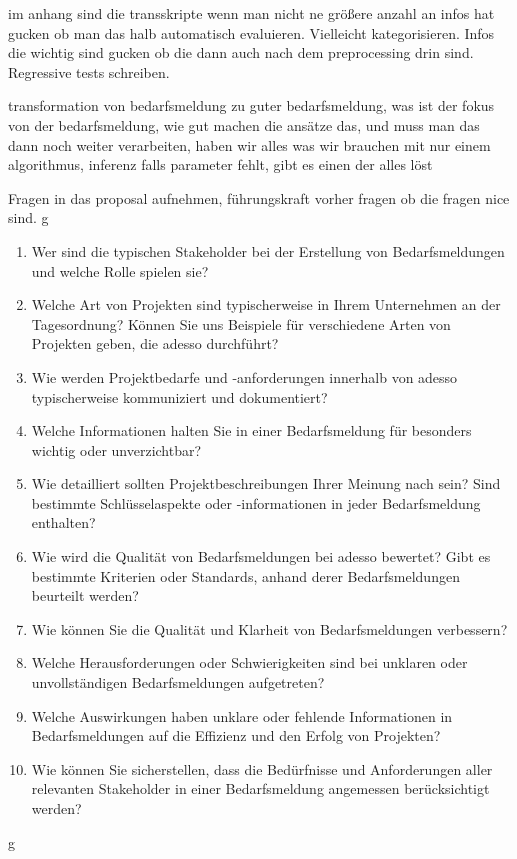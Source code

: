 im anhang sind die transskripte
wenn man nicht ne größere anzahl an infos hat gucken ob man das halb automatisch evaluieren. Vielleicht kategorisieren. Infos die wichtig sind gucken ob die dann auch nach dem preprocessing drin sind. Regressive tests schreiben.

transformation von bedarfsmeldung zu guter bedarfsmeldung, was ist der fokus von der bedarfsmeldung, wie gut machen die ansätze das, und muss man das dann noch weiter verarbeiten, haben wir alles was wir brauchen mit nur einem algorithmus, inferenz falls parameter fehlt, gibt es einen der alles löst

Fragen in das proposal aufnehmen, führungskraft vorher fragen ob die fragen nice sind.
\newpage
g
\begin{enumerate}
	\item Wer sind die typischen Stakeholder bei der Erstellung von Bedarfsmeldungen und welche
	Rolle spielen sie?
	\item Welche Art von Projekten sind typischerweise in Ihrem Unternehmen an der Tagesordnung?
	Können Sie uns Beispiele für verschiedene Arten von Projekten geben, die adesso
	durchführt?
	\item Wie werden Projektbedarfe und -anforderungen innerhalb von adesso typischerweise
	kommuniziert und dokumentiert?
	\item Welche Informationen halten Sie in einer Bedarfsmeldung für besonders wichtig oder
	unverzichtbar?
	\item Wie detailliert sollten Projektbeschreibungen Ihrer Meinung nach sein? Sind bestimmte
	Schlüsselaspekte oder -informationen in jeder Bedarfsmeldung enthalten?
	\item Wie wird die Qualität von Bedarfsmeldungen bei adesso bewertet? Gibt es bestimmte
	Kriterien oder Standards, anhand derer Bedarfsmeldungen beurteilt werden?
	\item Wie können Sie die Qualität und Klarheit von Bedarfsmeldungen verbessern?
	\item Welche Herausforderungen oder Schwierigkeiten sind bei unklaren oder unvollständigen
	Bedarfsmeldungen aufgetreten?
	\item Welche Auswirkungen haben unklare oder fehlende Informationen in Bedarfsmeldungen
	auf die Effizienz und den Erfolg von Projekten?
	\item Wie können Sie sicherstellen, dass die Bedürfnisse und Anforderungen aller relevanten
	Stakeholder in einer Bedarfsmeldung angemessen berücksichtigt werden?
\end{enumerate}
\newpage
g
\newpage